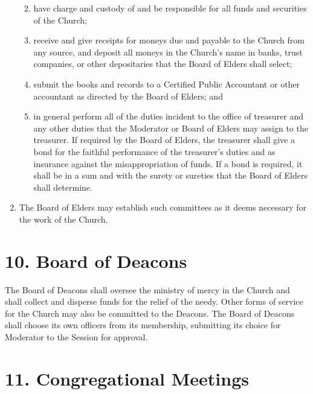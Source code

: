 \documentclass[
]{book}
\providecommand{\tightlist}{%
  \setlength{\itemsep}{0pt}\setlength{\parskip}{0pt}}
\begin{document}
\begin{enumerate}
  \begin{enumerate}
  \def\labelenumii{(\arabic{enumii})}
  \tightlist
  \item
    have charge and custody of and be responsible for all funds and securities of the Church;
  \item
    receive and give receipts for moneys due and payable to the Church from any source, and deposit all moneys in the Church's name in banks, trust companies, or other deposit­ar­­ies that the Board of Elders shall select;
  \item
    submit the books and records to a Certified Public Accoun­tant or other accountant as directed by the Board of Elders; and
  \item
    in general perform all of the duties inci­dent to the office of treasurer and any other duties that the Moderator or Board of Elders may assign to the treasurer.
    If required by the Board of Elders, the treasurer shall give a bond for the faithful perfor­mance of the treasurer's duties and as insurance against the misappropriation of funds. If a bond is required, it shall be in a sum and with the surety or sureties that the Board of Elders shall determine.
  \end{enumerate}
\item
  The Board of Elders may establish such committees as it deems necessary for the work of the Church.
\end{enumerate}

\hypertarget{board-of-deacons}{%
\section{10. Board of Deacons}\label{board-of-deacons}}

The Board of Deacons shall oversee the ministry of mercy in the Church and shall collect and dis­perse funds for the relief of the needy. Other forms of service for the Church may also be commit­ted to the Deacons. The Board of Deacons shall choose its own officers from its membership, submitting its choice for Moderator to the Session for approval.

\hypertarget{congregational-meetings}{%
\section{11. Congregational Meetings}\label{congregational-meetings}}
\end{document}
